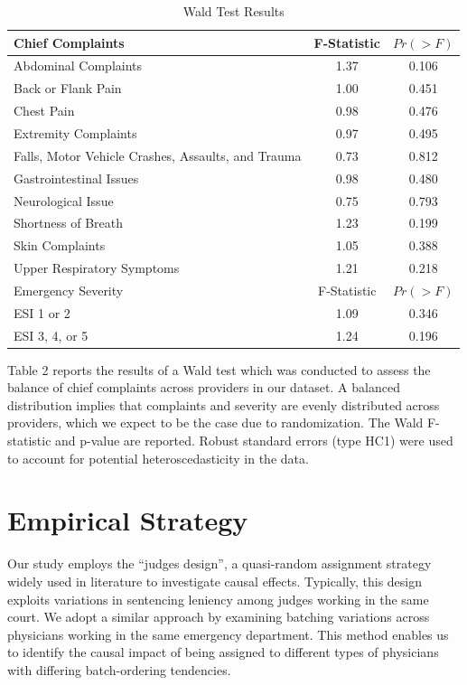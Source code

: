 \documentclass[,,nonblindrev]{informs}
\begin{document}
\begin{table}[htbp]
    \centering
    \caption{Wald Test Results}
    \begin{tabular}{lcc}
        \toprule
        Chief Complaints & F-Statistic & $Pr(> F)$ \\
        \midrule
        Abdominal Complaints & 1.37 & 0.106 \\
        Back or Flank Pain & 1.00 & 0.451 \\
        Chest Pain & 0.98 & 0.476 \\
        Extremity Complaints & 0.97 & 0.495 \\
        Falls, Motor Vehicle Crashes, Assaults, and Trauma & 0.73 & 0.812 \\
        Gastrointestinal Issues & 0.98 & 0.480 \\
        Neurological Issue & 0.75 & 0.793 \\
        Shortness of Breath & 1.23 & 0.199 \\
        Skin Complaints & 1.05 & 0.388 \\
        Upper Respiratory Symptoms & 1.21 & 0.218 \\
        \midrule
        Emergency Severity & F-Statistic & $Pr(> F)$ \\
        \midrule
        ESI 1 or 2 & 1.09 & 0.346 \\
        ESI 3, 4, or 5 & 1.24 & 0.196 \\
        \bottomrule
    \end{tabular}
\begin{tablenotes}
\tiny
\item Table 2 reports the results of a Wald test which was conducted to assess the balance of chief complaints across providers in our dataset. A balanced distribution implies that complaints and severity are evenly distributed across providers, which we expect to be the case due to randomization. The Wald F-statistic and p-value are reported. Robust standard errors (type HC1) were used to account for potential heteroscedasticity in the data.
\end{tablenotes}
\end{table}

\hypertarget{sec:3}{%
\section{Empirical Strategy}\label{sec:3}}

Our study employs the ``judges design'', a quasi-random assignment
strategy widely used in literature to investigate causal effects.
Typically, this design exploits variations in sentencing leniency among
judges working in the same court. We adopt a similar approach by
examining batching variations across physicians working in the same
emergency department. This method enables us to identify the causal
impact of being assigned to different types of physicians with differing
batch-ordering tendencies.
\end{document}

